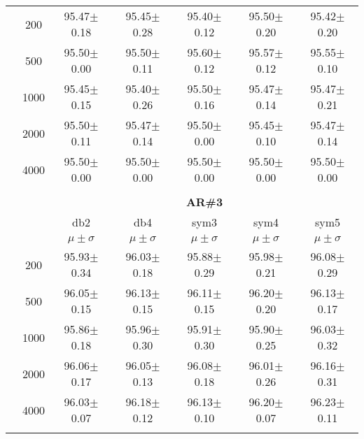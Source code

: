 \begin{table}[H]
\begin{tabular}{|c|c|c c c c c|}
\multicolumn{1}{|c|}{ \multirow{5}{*}{\rotatebox[origin=c]{90}{\textbf{Neurônios}}} }
&200	&95.47$\pm$0.18	&95.45$\pm$0.28	&95.40$\pm$0.12	&95.50$\pm$0.20	&95.42$\pm$0.20\\\cline{2-7}
&500	&95.50$\pm$0.00	&95.50$\pm$0.11	&95.60$\pm$0.12	&95.57$\pm$0.12	&95.55$\pm$0.10\\\cline{2-7}
&1000	&95.45$\pm$0.15	&95.40$\pm$0.26	&95.50$\pm$0.16	&95.47$\pm$0.14	&95.47$\pm$0.21\\\cline{2-7}
&2000	&95.50$\pm$0.11	&95.47$\pm$0.14	&95.50$\pm$0.00	&95.45$\pm$0.10	&95.47$\pm$0.14\\\cline{2-7}
&4000	&95.50$\pm$0.00	&95.50$\pm$0.00	&95.50$\pm$0.00	&95.50$\pm$0.00	&95.50$\pm$0.00
 \\ \midrule
\multicolumn{7}{c}{}\\ 



\cline{3-7}
\multicolumn{2}{c|}{\multirow{3}{*}{}} & \multicolumn{5}{c|}{\textbf{AR\#3}}   \\\cline{3-7} 
\multicolumn{2}{c|}{}  & db2 & db4 & sym3 & sym4 & sym5 \\\cline{3-7}%
\multicolumn{2}{c|}{}& $\mu \pm \sigma$ & $\mu \pm \sigma$ & $\mu \pm \sigma$ & $\mu \pm \sigma$ & $\mu \pm \sigma$ \\\hline

\multicolumn{1}{|c|}{ \multirow{5}{*}{\rotatebox[origin=c]{90}{\textbf{Neurônios}}} }
&200	&95.93$\pm$0.34	&96.03$\pm$0.18	&95.88$\pm$0.29	&95.98$\pm$0.21	&96.08$\pm$0.29\\\cline{2-7}
&500	&96.05$\pm$0.15	&96.13$\pm$0.15	&96.11$\pm$0.15	&96.20$\pm$0.20	&96.13$\pm$0.17\\\cline{2-7}
&1000	&95.86$\pm$0.18	&95.96$\pm$0.30	&95.91$\pm$0.30	&95.90$\pm$0.25	&96.03$\pm$0.32\\\cline{2-7}
&2000	&96.06$\pm$0.17	&96.05$\pm$0.13	&96.08$\pm$0.18	&96.01$\pm$0.26	&96.16$\pm$0.31\\\cline{2-7}
&4000	&96.03$\pm$0.07	&96.18$\pm$0.12	&96.13$\pm$0.10	&96.20$\pm$0.07	&96.23$\pm$0.11
\\\midrule

\multicolumn{7}{c}{}\\ 




\end{tabular}
\end{table}
